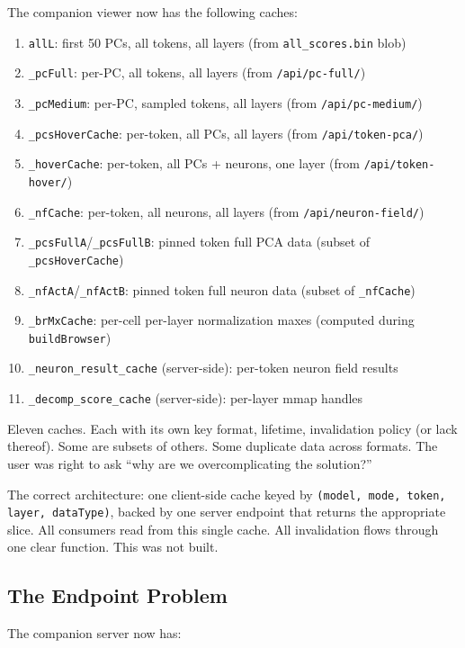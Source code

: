 \documentclass[11pt,a4paper]{article}
\begin{document}
The companion viewer now has the following caches:

\begin{enumerate}
  \item \texttt{allL}: first 50 PCs, all tokens, all layers (from \texttt{all\_scores.bin} blob)
  \item \texttt{\_pcFull}: per-PC, all tokens, all layers (from \texttt{/api/pc-full/})
  \item \texttt{\_pcMedium}: per-PC, sampled tokens, all layers (from \texttt{/api/pc-medium/})
  \item \texttt{\_pcsHoverCache}: per-token, all PCs, all layers (from \texttt{/api/token-pca/})
  \item \texttt{\_hoverCache}: per-token, all PCs + neurons, one layer (from \texttt{/api/token-hover/})
  \item \texttt{\_nfCache}: per-token, all neurons, all layers (from \texttt{/api/neuron-field/})
  \item \texttt{\_pcsFullA}/\texttt{\_pcsFullB}: pinned token full PCA data (subset of \texttt{\_pcsHoverCache})
  \item \texttt{\_nfActA}/\texttt{\_nfActB}: pinned token full neuron data (subset of \texttt{\_nfCache})
  \item \texttt{\_brMxCache}: per-cell per-layer normalization maxes (computed during \texttt{buildBrowser})
  \item \texttt{\_neuron\_result\_cache} (server-side): per-token neuron field results
  \item \texttt{\_decomp\_score\_cache} (server-side): per-layer mmap handles
\end{enumerate}

Eleven caches. Each with its own key format, lifetime, invalidation policy (or lack thereof). Some are subsets of others. Some duplicate data across formats. The user was right to ask ``why are we overcomplicating the solution?''

The correct architecture: one client-side cache keyed by \texttt{(model, mode, token, layer, dataType)}, backed by one server endpoint that returns the appropriate slice. All consumers read from this single cache. All invalidation flows through one clear function. This was not built.

\subsection{The Endpoint Problem}

The companion server now has:
\end{document}
